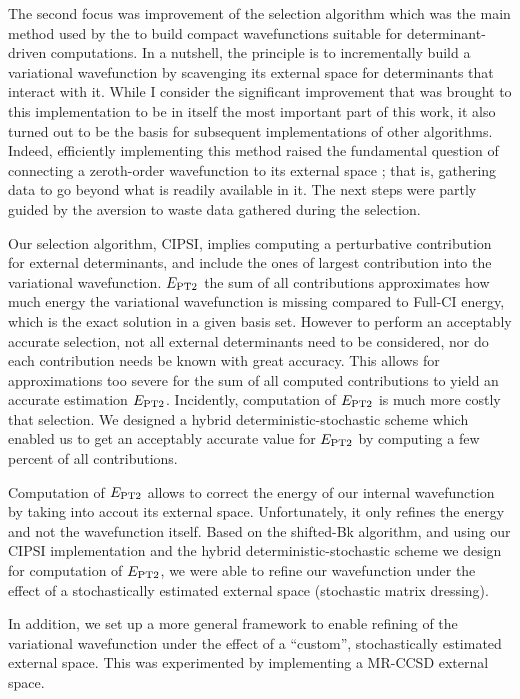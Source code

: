 \documentclass[12pt,a4paper]{report}
\begin{document}
The second focus was improvement of the selection algorithm which was the main method used by the \QP to build compact wavefunctions suitable for determinant-driven computations. In a nutshell, the principle is to incrementally build a variational wavefunction by scavenging its external space for determinants that interact with it. While I consider the significant improvement that was brought to this implementation to be in itself the most important part of this work, it also turned out to be the basis for subsequent implementations of other algorithms. Indeed, efficiently implementing this method raised the fundamental question of connecting a \alert{zeroth-order} wavefunction to its external space ; that is, gathering data to go beyond what is readily available in it. The next steps were partly guided by the aversion to waste data gathered during the selection.

Our selection algorithm, CIPSI, implies computing a perturbative contribution for external determinants, and include the ones of largest contribution into the variational wavefunction. $E_\text{PT2}$ the sum of all contributions approximates how much energy the variational wavefunction is missing compared to Full-CI energy, which is the exact solution in a given basis set. However to perform an acceptably accurate selection, not all external determinants need to be considered, nor do each contribution needs be known with great accuracy. This allows for approximations too severe for the sum of all computed contributions to yield an accurate estimation $E_\text{PT2}$. Incidently, computation of $E_\text{PT2}$ is much more costly that selection. We designed a hybrid deterministic-stochastic scheme which enabled us to get an acceptably accurate value for $E_\text{PT2}$ by computing a few percent of all contributions.

Computation of $E_\text{PT2}$ allows to correct the energy of our internal wavefunction by taking into accout its external space. Unfortunately, it only refines the energy and not the wavefunction itself. Based on the shifted-Bk algorithm, and using our CIPSI implementation and the hybrid deterministic-stochastic scheme we design for computation of $E_\text{PT2}$, we were able to refine our wavefunction under the effect of a stochastically estimated external space (stochastic matrix dressing).

In addition, we set up a more general framework to enable refining of the variational wavefunction under the effect of a ``custom'', stochastically estimated external space. This was experimented by implementing a MR-CCSD external space.
\end{document}
